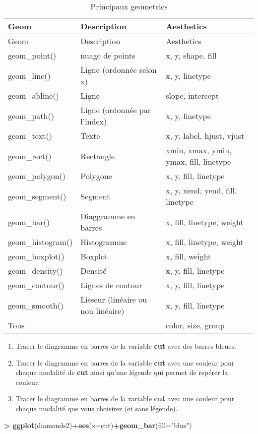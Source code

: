 \documentclass[]{article}
\newenvironment{Shaded}{\begin{snugshade}}{\end{snugshade}}
\newcommand{\DataTypeTok}[1]{\textcolor[rgb]{0.13,0.29,0.53}{#1}}
\newcommand{\KeywordTok}[1]{\textcolor[rgb]{0.13,0.29,0.53}{\textbf{#1}}}
\newcommand{\NormalTok}[1]{#1}
\newcommand{\OperatorTok}[1]{\textcolor[rgb]{0.81,0.36,0.00}{\textbf{#1}}}
\newcommand{\StringTok}[1]{\textcolor[rgb]{0.31,0.60,0.02}{#1}}
\providecommand{\tightlist}{%
  \setlength{\itemsep}{0pt}\setlength{\parskip}{0pt}}
\theoremstyle{definition}
\theoremstyle{definition}
\theoremstyle{definition}
\theoremstyle{remark}
\let\BeginKnitrBlock\begin \let\EndKnitrBlock\end
\begin{document}
\begin{longtable}[]{@{}lll@{}}
\caption{\label{tab:geom} Principaux geometrics}\tabularnewline
\toprule
Geom & Description & Aesthetics\tabularnewline
\midrule
\endfirsthead
\toprule
Geom & Description & Aesthetics\tabularnewline
\midrule
\endhead
geom\_point() & nuage de points & x, y, shape, fill\tabularnewline
geom\_line() & Ligne (ordonnée selon x) & x, y, linetype\tabularnewline
geom\_abline() & Ligne & slope, intercept\tabularnewline
geom\_path() & Ligne (ordonnée par l'index) & x, y, linetype\tabularnewline
geom\_text() & Texte & x, y, label, hjust, vjust\tabularnewline
geom\_rect() & Rectangle & xmin, xmax, ymin, ymax, fill, linetype\tabularnewline
geom\_polygon() & Polygone & x, y, fill, linetype\tabularnewline
geom\_segment() & Segment & x, y, xend, yend, fill, linetype\tabularnewline
geom\_bar() & Diaggramme en barres & x, fill, linetype, weight\tabularnewline
geom\_histogram() & Histogramme & x, fill, linetype, weight\tabularnewline
geom\_boxplot() & Boxplot & x, fill, weight\tabularnewline
geom\_density() & Densité & x, y, fill, linetype\tabularnewline
geom\_contour() & Lignes de contour & x, y, fill, linetype\tabularnewline
geom\_smooth() & Lisseur (linéaire ou non linéaire) & x, y, fill, linetype\tabularnewline
Tous & & color, size, group\tabularnewline
\bottomrule
\end{longtable}

\BeginKnitrBlock{exercise}[Diagrammes en barres]
\protect\hypertarget{exr:exoggplot2}{}{\label{exr:exoggplot2} \iffalse (Diagrammes en barres) \fi{} }
\EndKnitrBlock{exercise}

\begin{enumerate}
\def\labelenumi{\arabic{enumi}.}
\tightlist
\item
  Tracer le diagramme en barres de la variable \textbf{cut} avec des barres bleues.
\item
  Tracer le diagramme en barres de la variable \textbf{cut} avec une couleur pour chaque modalité de \textbf{cut} ainsi qu'une légende qui permet de repérer la couleur.
\item
  Tracer le diagramme en barres de la variable \textbf{cut} avec une couleur pour chaque modalité que vous choisirez (et sans légende).
\end{enumerate}

\begin{Shaded}
\begin{Highlighting}[]
\OperatorTok{>}\StringTok{ }\KeywordTok{ggplot}\NormalTok{(diamonds2)}\OperatorTok{+}\KeywordTok{aes}\NormalTok{(}\DataTypeTok{x=}\NormalTok{cut)}\OperatorTok{+}\KeywordTok{geom_bar}\NormalTok{(}\DataTypeTok{fill=}\StringTok{"blue"}\NormalTok{)}
\end{Highlighting}
\end{Shaded}
\end{document}
